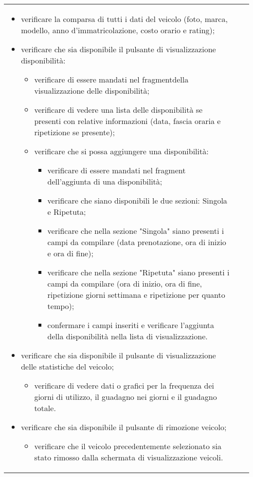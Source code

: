 \begin{longtable}{ >{\centering}p{} >{\centering}p{} >{\centering}p{}
			}
\begin{itemize}
		 	\item verificare la comparsa di tutti i dati del veicolo (foto, marca, modello, anno d'immatricolazione, costo orario e rating);
		 	\item verificare che sia disponibile il pulsante di visualizzazione disponibilità:
		 	\begin{itemize}
		 		\item verificare di essere mandati nel fragment\glosp della visualizzazione delle disponibilità;
		 		\item verificare di vedere una lista delle disponibilità se presenti con relative informazioni (data, fascia oraria e ripetizione se presente);
		 		\item verificare che si possa aggiungere una disponibilità:
		 		\begin{itemize}
		 			\item verificare di essere mandati nel fragment dell'aggiunta di una disponibilità;
		 			\item verificare che siano disponibili le due sezioni: Singola e Ripetuta;
		 			\item verificare che nella sezione "Singola" siano presenti i campi da compilare (data prenotazione, ora di inizio e ora di fine);
		 			\item verificare che nella sezione "Ripetuta" siano presenti i campi da compilare (ora di inizio, ora di fine, ripetizione giorni settimana e ripetizione per quanto tempo);
		 			\item confermare i campi inseriti e verificare l'aggiunta della disponibilità nella lista di visualizzazione.
		 		\end{itemize}
		 	\end{itemize}
	 		\item verificare che sia disponibile il pulsante di visualizzazione delle statistiche del veicolo;
	 		\begin{itemize}
	 			\item verificare di vedere dati o grafici per la frequenza dei giorni di utilizzo, il guadagno nei giorni e il guadagno totale.
	 		\end{itemize}
		 	\item verificare che sia disponibile il pulsante di rimozione veicolo;
		 	\begin{itemize}
		 		\item verificare che il veicolo precedentemente selezionato sia stato rimosso dalla schermata di visualizzazione veicoli.
		 	\end{itemize}

\end{itemize}
\end{longtable}
